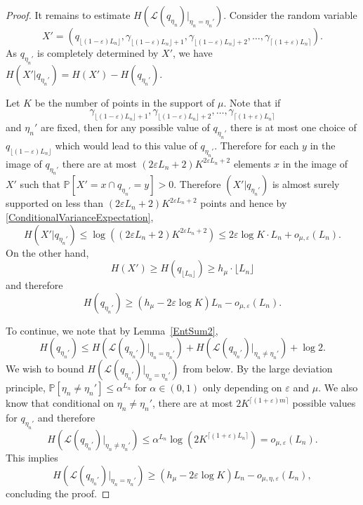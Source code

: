\documentclass[10pt, english,oneside,reqno]{amsart}
\theoremstyle{plain}
\theoremstyle{remark}
\numberwithin{equation}{section}
\numberwithin{figure}{section}
\newcommand{\eps}{\varepsilon}
\newcommand{\Prob}{\mathbb{P}}
\begin{document}
\begin{proof}
    It remains to estimate $H(\mathcal{L}(q_{\eta_n})|_{\eta_n = \eta_n'})$. Consider the random variable $$X' = (q_{\lfloor (1-\eps) L_n \rfloor}, \gamma_{\lfloor (1-\eps) L_n \rfloor + 1}, \gamma_{\lfloor (1-\eps) L_n \rfloor + 2}, \ldots , \gamma_{\lceil (1+\eps) L_n \rceil}).$$ As $q_{\eta_n'}$ is completely determined by $X'$, we have $H(X'|q_{\eta_n'}) = H(X') - H(q_{\eta_n'}).$

    Let $K$ be the number of points in the support of $\mu$. Note that if $$\gamma_{\lfloor (1-\eps) L_n \rfloor + 1}, \gamma_{\lfloor (1-\eps) L_n \rfloor + 2}, \ldots , \gamma_{\lceil (1+\eps) L_n \rceil }$$ and $\eta_n'$ are fixed, then for any possible value of $q_{\eta_n'}$ there is at most one choice of $q_{\lfloor (1-\eps)L_n \rfloor}$ which would lead to this value of $q_{\eta_n'}$. Therefore for each $y$ in the image of $q_{\eta_n'}$ there are at most $(2\eps L_n + 2)K^{2\eps L_n + 2}$ elements $x$ in the image of $X'$ such that $\mathbb{P}[X' = x \cap q_{\eta_n'} = y] > 0$. Therefore $(X'|q_{\eta_n'})$ is almost surely supported on less than $(2\eps L_n + 2)K^{2\eps L_n + 2}$ points and hence by \eqref{ConditionalVarianceExpectation}, $$H(X'|q_{\eta_n'}) \leq \log\left((2\eps L_n + 2)K^{2\eps L_n + 2} \right) \leq  2\eps \log K \cdot L_n  + o_{\mu,\eps}( L_n). $$
    On the other hand, 
    \begin{equation}\label{HXprimebound}
        H(X') \geq H(q_{\lfloor L_n \rfloor}) \geq h_{\mu} \cdot \lfloor L_n \rfloor
    \end{equation}
    and therefore $$H(q_{\eta_n'}) \geq (h_{\mu} - 2\eps \log K) L_n - o_{\mu,\eps}(L_n). $$

    To continue, we note that by Lemma~\ref{EntSum2}, 
    \begin{equation}\label{SecondBound}
        H(q_{\eta_n'}) \leq H(\mathcal{L}(q_{\eta_n'})|_{\eta_n = \eta_n'}) + H(\mathcal{L}(q_{\eta_n'})|_{\eta_n \neq \eta_n'}) + \log 2.
    \end{equation} We wish to bound $H(\mathcal{L}(q_{\eta_n'})|_{\eta_n = \eta_n'})$ from below.  By the large deviation principle, $\Prob[\eta_n \neq \eta_n'] \leq \alpha^{L_n}$ for $\alpha \in (0,1)$ only depending on $\eps$ and $\mu$. We also know that conditional on $\eta_n \neq \eta_n'$, there are at most $2K^{\lceil (1 + \eps)m \rceil}$ possible values for $q_{\eta_n'}$ and therefore $$H(\mathcal{L}(q_{\eta_n'})|_{\eta_n \neq \eta_n'}) \leq \alpha^{L_n} \log\left( 2K^{\lceil (1 + \eps)L_n \rceil} \right) = o_{\mu,\eps}(L_n).  $$ This implies $$H(\mathcal{L}(q_{\eta_n'})|_{\eta_n = \eta_n'}) \geq (h_{\mu} - 2\eps \log K) L_n - o_{\mu, \eta, \eps}(L_n),$$ concluding the proof.
\end{proof}
\end{document}
